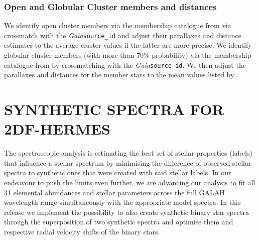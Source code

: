 \documentclass[
  journal=pasa,
  manuscript=research-paper, %
  year=2023,
  volume=37
]{cup-journal}
\newcommand{\Gaia}{\textit{Gaia}\xspace}
\begin{document}
\subsubsection{Open and Globular Cluster members and distances} \label{sec:oc_gc}

We identify open cluster members via the membership catalogue from \citet{CantatGaudin2020} via crossmatch with the \Gaia \texttt{source\_id} and adjust their parallaxes and distance estimates to the average cluster values if the latter are more precise. We identify globular cluster members (with more than 70\% probability) via the membership catalogue from \citet{Vasiliev2021} by crossmatching with the \Gaia \texttt{source\_id}. We then adjust the parallaxes and distances for the member stars to the mean values listed by \citet{Baumgardt2021}.

\newpage
\section{SYNTHETIC SPECTRA FOR 2DF-HERMES}
\label{sec:allspec_analysis}

The spectroscopic analysis is estimating the best set of stellar properties (labels) that influence a stellar spectrum by minimising the difference of observed stellar spectra to synthetic ones that were created with said stellar labels. In our endeavour to push the limits even further, we are advancing our analysis to fit all 31 elemental abundances and stellar parameters across the full GALAH wavelength range simultaneously with the appropriate model spectra. In this release we implement the possibility to also create synthetic binary star spectra through the superposition of two synthetic spectra and optimise them and respective radial velocity shifts of the binary stars.
\end{document}
